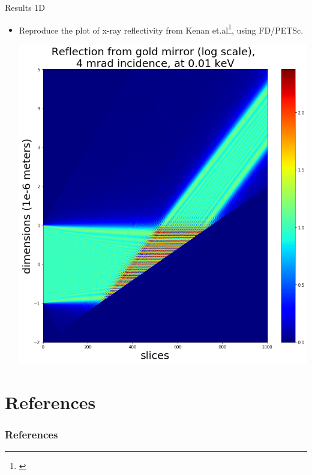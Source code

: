 \documentclass{beamer}
\begin{document}
\begin{frame}{Results 1D}
\begin{itemize}
\item Reproduce the plot of x-ray reflectivity from Kenan et.al\footnote{\cite{Li17}}, using FD/PETSc.
	\begin{center}
	\includegraphics[scale=0.225]{petsc1d}
	\end{center}
\end{itemize}
\end{frame}

\renewcommand*{\bibfont}{\small}
\section{References}
\begin{frame}[t, allowframebreaks]
\frametitle{References}


\end{frame}
\end{document}
